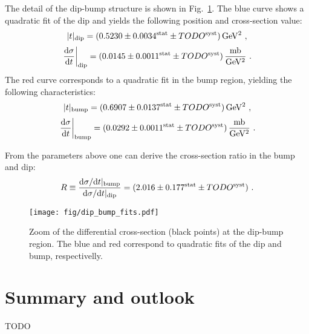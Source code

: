 \documentclass[doublecol]{epl/epl2}
\def\d{{\rm d}}
\def\un#1{\,{\rm #1}}
\begin{document}
The detail of the dip-bump structure is shown in Fig.~\ref{f:dip bump fits}. The blue curve shows a quadratic fit of the dip and yields the following position and cross-section value:
\begin{equation}
\label{e:t dip}
|t|_{\rm dip} = (0.5230 \pm 0.0034^{\rm stat} \pm TODO^{\rm syst})\un{GeV^2}\ ,
\end{equation}
\begin{equation}
\label{e:dsdt dip}
\left.{\d\sigma\over\d t}\right|_{\rm dip} = (0.0145 \pm 0.0011^{\rm stat} \pm TODO^{\rm syst})\un{{mb\over GeV^2}}\ .
\end{equation}
The red curve corresponds to a quadratic fit in the bump region, yielding the following characteristics:
\begin{equation}
\label{e:t bump}
|t|_{\rm bump} = (0.6907 \pm 0.0137^{\rm stat} \pm TODO^{\rm syst})\un{GeV^2}\ ,
\end{equation}
\begin{equation}
\label{e:dsdt bump}
\left.{\d\sigma\over\d t}\right|_{\rm bump} = (0.0292 \pm 0.0011^{\rm stat} \pm TODO^{\rm syst})\un{{mb\over GeV^2}}\ .
\end{equation}

From the parameters above one can derive the cross-section ratio in the bump and dip:
\begin{equation}
\label{e:R}
R \equiv {{\d\sigma/\d t}|_{\rm bump} \over {\d\sigma/\d t}|_{\rm dip}} = (2.016 \pm 0.177^{\rm stat} \pm TODO^{\rm syst})\ .
\end{equation}


\begin{figure}
\begin{center}
\texttt{[image: fig/dip\_bump\_fits.pdf]}
\vskip-5mm
\caption{Zoom of the differential cross-section (black points) at the dip-bump region. The blue and red correspond to quadratic fits of the dip and bump, respectivelly.}
\label{f:dip bump fits}
\end{center}
\end{figure}


\section{Summary and outlook}
\label{s:summary}

TODO


\end{document}
